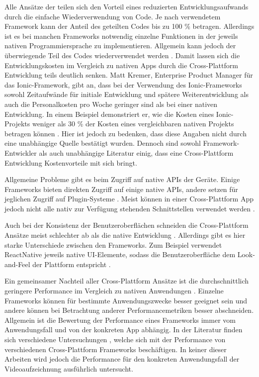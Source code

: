 Alle Ansätze der teilen sich den Vorteil eines reduzierten Entwicklungsaufwands durch die einfache Wiederverwendung von Code.
Je nach verwendetem Framework kann der Anteil des geteilten Codes bis zu 100 \% betragen.
Allerdings ist es bei manchen Frameworks notwendig einzelne Funktionen in der jeweils nativen Programmiersprache zu implementieren.
Allgemein kann jedoch der überwiegende Teil des Codes wiederverwendet werden \cite{Nawrocki_Comparison_Hybrid_Native_Frameworks}.
Damit lassen sich die Entwicklungskosten im Vergleich zu nativen Apps durch die Cross-Plattform Entwicklung teils deutlich senken.
Matt Kremer, Enterprise Product Manager für das Ionic-Framework, gibt an, dass bei der Verwendung des Ionic-Frameworks sowohl Zeitaufwände für initiale Entwicklung und spätere Weiterentwicklung als auch die Personalkosten pro Woche geringer sind als bei einer nativen Entwicklung.
In einem Beispiel demonstriert er, wie die Kosten eines Ionic-Projekts weniger als 30 \% der Kosten eines vergleichbaren nativen Projekts betragen können \cite{Kremer_IonicROI}.
Hier ist jedoch zu bedenken, dass diese Angaben nicht durch eine unabhängige Quelle bestätigt wurden.
Dennoch sind sowohl Framework-Entwickler \cite{Xamarin_Einfuehrung, Kremer_IonicROI} als auch unabhängige Literatur \cite{Pinto_Native_to_Cross_Platform, Que_Comparison_Hybrid_Native, Nawrocki_Comparison_Hybrid_Native_Frameworks} einig, dass eine Cross-Plattform Entwicklung Kostenvorteile mit sich bringt.

Allgemeine Probleme gibt es beim Zugriff auf native \acp{API} der Geräte.
Einige Frameworks bieten direkten Zugriff auf einige native \acp{API}, andere setzen für jeglichen Zugriff auf Plugin-Systeme \cite{Heitkoetter_CrossPlatform_Comparison, Sasidaran_Survey_NativeHybrid}.
Meist können in einer Cross-Plattform App jedoch nicht alle nativ zur Verfügung stehenden Schnittstellen verwendet werden \cite{Pinto_Native_to_Cross_Platform}.

Auch bei der Konsistenz der Benutzeroberflächen schneiden die Cross-Plattform Ansätze meist schlechter ab als die native Entwicklung \cite{Manchanda_CrossPlatformFrameworks}.
Allerdings gibt es hier starke Unterschiede zwischen den Frameworks. 
Zum Beispiel verwendet ReactNative jeweils native \ac{UI}-Elemente, sodass die Benutzeroberfläche dem Look-and-Feel der Plattform entspricht \cite{React_NativeComponents}.

Ein gemeinsamer Nachteil aller Cross-Plattform Ansätze ist die durchschnittlich geringere Performance im Vergleich zu nativen Anwendungen \cite{Que_Comparison_Hybrid_Native, Pinto_Native_to_Cross_Platform}.
Einzelne Frameworks können für bestimmte Anwendungszwecke besser geeignet sein und andere können bei Betrachtung anderer Performancemetriken besser abschneiden.
Allgemein ist die Bewertung der Performance eines Frameworks immer vom Anwendungsfall und von der konkreten App abhängig.
In der Literatur finden sich verschiedene Untersuchungen \cite{Nawrocki_Comparison_Hybrid_Native_Frameworks,Biorn-Hansen_PerformanceOverhead_CrossPlatform,Jia_Performance}, welche sich mit der Performance von verschiedenen Cross-Plattform Frameworks beschäftigen. 
In keiner dieser Arbeiten wird jedoch die Performance für den konkreten Anwendungsfall der Videoaufzeichnung ausführlich untersucht.